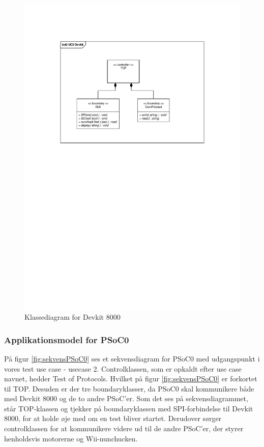 \begin{figure}[H]
	\centering
	\includegraphics[trim = {3.2cm 16.1cm 3.2cm 3.5cm}, clip = true, width=\textwidth] {Systemarkitektur/images/klassediagramDevkit.pdf}
	\caption{Klassediagram for Devkit 8000}
	\label{fig:klasseDevkit}
\end{figure}

\subsubsection{Applikationsmodel for PSoC0}
På figur \ref{fig:sekvensPSoC0} ses et sekvensdiagram for PSoC0 med udgangspunkt i vores test use case - usecase 2. Controlklassen, som er opkaldt efter use case navnet, hedder Test of Protocols. Hvilket på figur \ref{fig:sekvensPSoC0} er forkortet til TOP. Desuden er der tre boundaryklasser, da PSoC0 skal kommunikere både med Devkit 8000 og de to andre PSoC'er. Som det ses på sekvensdiagrammet, står TOP-klassen og tjekker på boundaryklassen med SPI-forbindelse til Devkit 8000, for at holde øje med om en test bliver startet. Derudover sørger controlklassen for at kommunikere videre ud til de andre PSoC'er, der styrer henholdsvis motorerne og Wii-nunchucken. 

